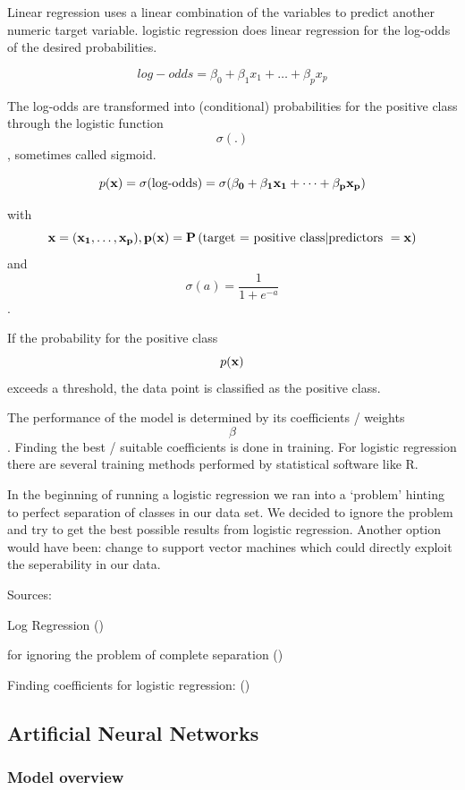 \documentclass[]{article}
\begin{document}
Linear regression uses a linear combination of the variables to predict
another numeric target variable. logistic regression does linear
regression for the log-odds of the desired probabilities.

\[
{log-odds} = \beta_0 + \beta_1 x_1 + \dots + \beta_p x_p     
\]

The log-odds are transformed into (conditional) probabilities for the
positive class through the logistic function \[  \sigma(.)  \],
sometimes called sigmoid.

\[
p(\bf{x}) = \sigma(\text{log-odds}) = \sigma(\beta_0 + \beta_1 x_1 + \dots + \beta_p x_p ) 
\]

with
\[ \bf{x}= ( x_1, \dots, x_p) , p(\bf{x}) = \mathbf{P}\left(\text{target = positive class} | \text{predictors } = \bf{x} \right) \]
and \[ \sigma(a) = \frac{1}{1+e^{-a}} \].

If the probability for the positive class \[ p(\bf{x})\] exceeds a
threshold, the data point is classified as the positive class.

The performance of the model is determined by its coefficients / weights
\[\beta \]. Finding the best / suitable coefficients is done in
training. For logistic regression there are several training methods
performed by statistical software like R.

In the beginning of running a logistic regression we ran into a
`problem' hinting to perfect separation of classes in our data set. We
decided to ignore the problem and try to get the best possible results
from logistic regression. Another option would have been: change to
support vector machines which could directly exploit the seperability in
our data.

Sources:

Log Regression (\cite{logreg})

for ignoring the problem of complete separation (\cite{ucla})

Finding coefficients for logistic regression: (\cite{newton})

\subsection{Artificial Neural
Networks}\label{artificial-neural-networks}

\subsubsection{Model overview}\label{model-overview}
\end{document}
